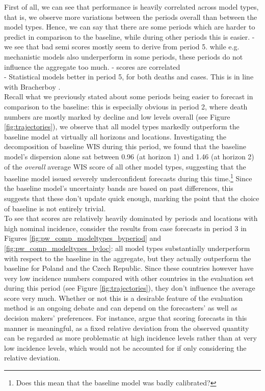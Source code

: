 First of all, we can see that performance is heavily correlated across model types, that is, we observe more variations between the periods overall than between the model types. Hence, we can say that there are some periods which are harder to predict in comparison to the baseline, while during other periods this is easier. %
- we see that bad semi scores mostly seem to derive from period 5. while e.g. mechanistic models also underperform in some periods, these periods do not influence the aggregate too much.
- scores are correlated\\
- Statistical models better in period 5, for both deaths and cases. This is in line with Bracherboy .\\
Recall what we previously stated about some periods being easier to forecast in comparison to the baseline: this is especially obvious in period 2, where death numbers are mostly marked by decline and low levels overall (see Figure \ref{fig:trajectories}), we observe that all model types markedly outperform the baseline model at virtually all horizons and locations. Investigating the decomposition of baseline WIS during this period, we found that the baseline model's dispersion alone sat between 0.96 (at horizon 1) and 1.46 (at horizon 2) of the \textit{overall} average WIS score of all other model types, suggesting that the baseline model issued severely underconfident forecasts during this time.\footnote{Does this mean that the baseline model was badly calibrated?} Since the baseline model's uncertainty bands are based on past differences, this suggests that these don't update quick enough, marking the point that the choice of baseline is not entirely trivial. \\
To see that scores are relatively heavily dominated by periods and locations with high nominal incidence, consider the results from case forecasts in period 3 in Figures \ref{fig:pw_comp_modeltypes_byperiod} and \ref{fig:pw_comp_modeltypes_byloc}: all model types substantially underperform with respect to the baseline in the aggregate, but they actually outperform the baseline for Poland and the Czech Republic. Since these countries however have very low incidence numbers compared with other countries in the evaluation set during this period (see Figure \ref{fig:trajectories}), they don't influence the average score very much. Whether or not this is a desirable feature of the evaluation method is an ongoing debate and can depend on the forecasters' as well as decision makers' preferences. For instance, \cite{bracher_evaluating_2021} argue that scoring forecasts in this manner is meaningful, as a fixed relative deviation from the observed quantity can be regarded as more problematic at high incidence levels rather than at very low incidence levels, which would not be accounted for if only considering the relative deviation.\\  
